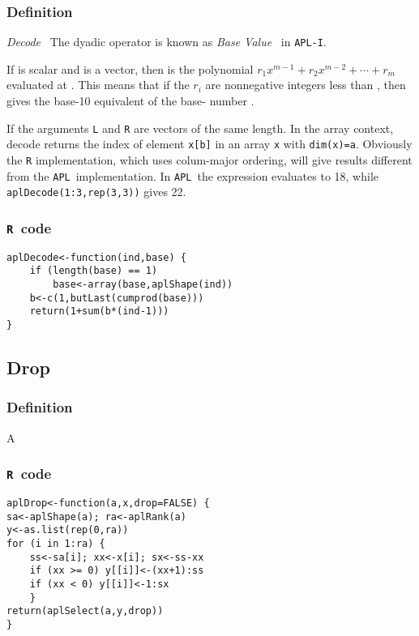 \documentclass[11pt]{amsart}
\theoremstyle{plain}
\theoremstyle{definition}
\theoremstyle{remark}
\newcommand{\tR}{\texttt{R}}
\newcommand{\tA}{\texttt{APL}}
\newcommand{\tRc}[1]{\lstinline{#1}}
\newcommand{\tAc}[1]{{\apl{#1}}}
\begin{document}
\subsubsection{Definition}
\emph{Decode}~\citep[p. 94]{apl2_88} The dyadic operator \tAc{L\qdtack R} is known as \emph{Base Value}~\citep[p. 17-21]{helzer_89} in \texttt{APL-I}.

If \tAc{L} is scalar and \tAc{R} is a vector, then \tAc{L\qdtack R} is the polynomial
\(r_1x^{m-1}+r_{2}x^{m-2}+\cdots+r_m\) evaluated at \tAc{L}. This means that if
the \(r_i\) are nonnegative integers less than \tAc{L}, then \tAc{L\qdtack R} gives the
base-10 equivalent of the base-\tAc{L} number \tAc{R}.

If the arguments \texttt{L} and \texttt{R} are vectors of the
same length. In the array context, decode returns the index of element \lstinline{x[b]} in an array
\lstinline{x} with \lstinline{dim(x)=a}. Obviously the \texttt{R} implementation, which uses
colum-major ordering, will give results different from the \tA\ implementation. In \tA\
the expression \tAc{3 3 3\qdtack 1 2 3} evaluates to 18, while \tRc{aplDecode(1:3,rep(3,3))} gives 22.
\subsubsection{\tR\ code}\quad
\begin{lstlisting}
aplDecode<-function(ind,base) {
    if (length(base) == 1)
        base<-array(base,aplShape(ind))
    b<-c(1,butLast(cumprod(base)))
    return(1+sum(b*(ind-1)))
}
\end{lstlisting}
\subsubsection{}\quad

\subsection{Drop}\quad
\subsubsection{Definition}

A
\subsubsection{\tR\ code}\quad
\begin{lstlisting}
aplDrop<-function(a,x,drop=FALSE) {
sa<-aplShape(a); ra<-aplRank(a)
y<-as.list(rep(0,ra))
for (i in 1:ra) {
    ss<-sa[i]; xx<-x[i]; sx<-ss-xx
    if (xx >= 0) y[[i]]<-(xx+1):ss
    if (xx < 0) y[[i]]<-1:sx
    }
return(aplSelect(a,y,drop))
}
\end{lstlisting}
\end{document}
